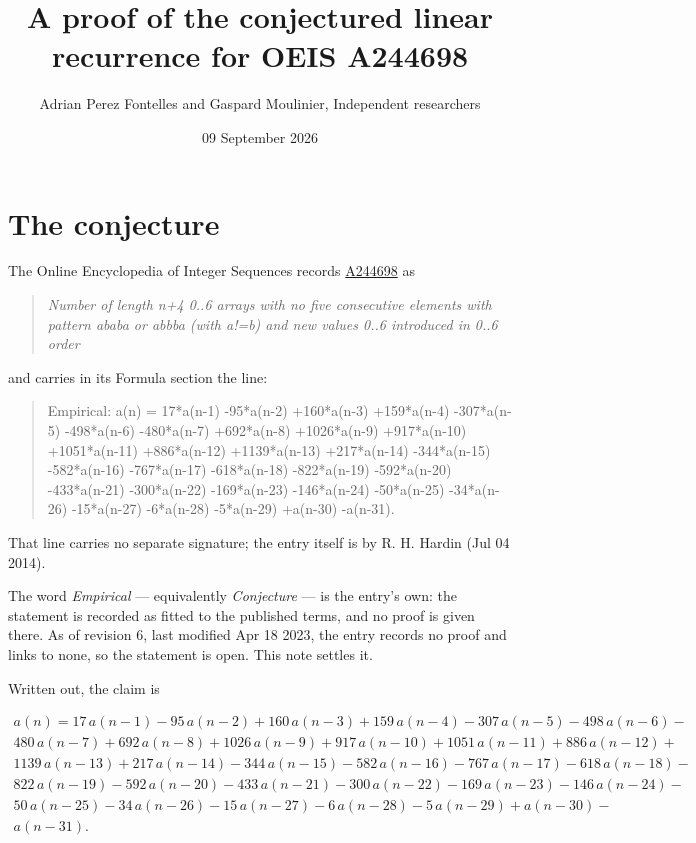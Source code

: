 \documentclass[11pt]{article}
\title{A proof of the conjectured linear recurrence for OEIS A244698}
\author{Adrian Perez Fontelles and Gaspard Moulinier, Independent researchers}
\date{09 September 2026}
\theoremstyle{definition}
\begin{document}
\maketitle
\section{The conjecture}

The Online Encyclopedia of Integer Sequences records \href{https://oeis.org/A244698}{A244698} as

\begin{quote}\itshape Number of length n+4 0..6 arrays with no five consecutive elements with pattern ababa or abbba (with a!=b) and new values 0..6 introduced in 0..6 order\end{quote}

and carries in its Formula section the line:

\begin{quote}\ttfamily Empirical: a(n) = 17*a(n-1) -95*a(n-2) +160*a(n-3) +159*a(n-4) -307*a(n-5) -498*a(n-6) -480*a(n-7) +692*a(n-8) +1026*a(n-9) +917*a(n-10) +1051*a(n-11) +886*a(n-12) +1139*a(n-13) +217*a(n-14) -344*a(n-15) -582*a(n-16) -767*a(n-17) -618*a(n-18) -822*a(n-19) -592*a(n-20) -433*a(n-21) -300*a(n-22) -169*a(n-23) -146*a(n-24) -50*a(n-25) -34*a(n-26) -15*a(n-27) -6*a(n-28) -5*a(n-29) +a(n-30) -a(n-31).\end{quote}

That line carries no separate signature; the entry itself is by R. H. Hardin (Jul 04 2014).

The word {\itshape Empirical} --- equivalently {\itshape Conjecture} --- is the entry's own: the statement is recorded as fitted to the published terms, and no proof is given there. As of revision 6, last modified Apr 18 2023, the entry records no proof and links to none, so the statement is open. This note settles it.

Written out, the claim is

\begin{multline*} a(n) = 17\,a(n-1) - 95\,a(n-2) + 160\,a(n-3) + 159\,a(n-4) - 307\,a(n-5) - 498\,a(n-6) - \\ 480\,a(n-7) + 692\,a(n-8) + 1026\,a(n-9) + 917\,a(n-10) + 1051\,a(n-11) + 886\,a(n-12) + \\ 1139\,a(n-13) + 217\,a(n-14) - 344\,a(n-15) - 582\,a(n-16) - 767\,a(n-17) - 618\,a(n-18) - \\ 822\,a(n-19) - 592\,a(n-20) - 433\,a(n-21) - 300\,a(n-22) - 169\,a(n-23) - 146\,a(n-24) - \\ 50\,a(n-25) - 34\,a(n-26) - 15\,a(n-27) - 6\,a(n-28) - 5\,a(n-29) + a(n-30) - \\ a(n-31). \end{multline*}
\end{document}
